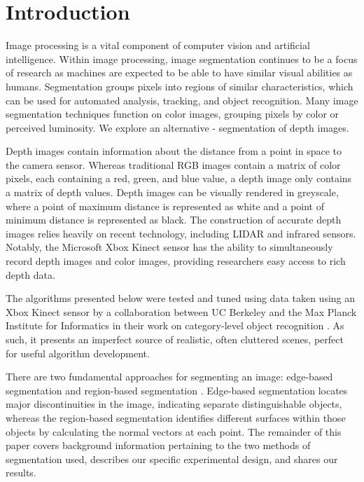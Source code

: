 
\section{Introduction}
\label{sec:intro}
Image processing is a vital component of computer vision and
artificial intelligence. Within image processing, image segmentation
continues to be a focus of research as machines are expected to be
able to have similar visual abilities as humans. Segmentation 
groups pixels into regions of similar characteristics, which can be used
for automated analysis, tracking, and object recognition.  Many image segmentation techniques function on color images, grouping pixels by color or perceived luminosity.  We explore an alternative - segmentation of depth images.

Depth images contain information about the distance from a point in space to the camera sensor. Whereas traditional RGB images contain a matrix
of color pixels, each containing a red, green, and blue value, a depth image
only contains a matrix of depth values. Depth images can be visually
rendered in greyscale, where a point of maximum distance
is represented as white and a point of minimum distance is represented
as black. The construction of accurate depth images relies heavily on recent technology, including LIDAR and infrared sensors.  Notably, the Microsoft Xbox Kinect
sensor has the ability to simultaneously record depth images and color
images, providing researchers easy access to rich depth data.

The algorithms presented below were tested and tuned using data taken using an Xbox Kinect sensor by a collaboration between UC Berkeley and the Max Planck Institute for Informatics in their work on category-level object recognition \cite{kinect}.  As such, it presents an imperfect source of realistic, often cluttered scenes, perfect for useful algorithm development.

There are two fundamental approaches for segmenting an image: edge-based
segmentation and region-based segmentation \cite{aima}. Edge-based
segmentation locates major discontinuities in the image, indicating
separate distinguishable objects, whereas the region-based segmentation
identifies different surfaces within those objects by calculating the
normal vectors at each point. The remainder of this paper covers
background information pertaining to the two methods of segmentation used,
describes our specific experimental design, and shares our results. 

